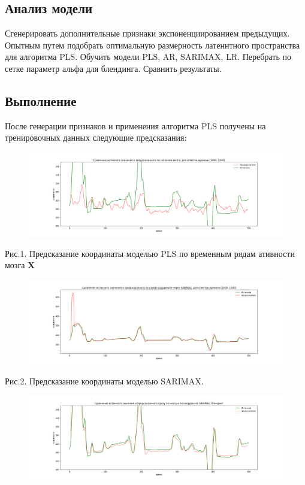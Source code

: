 \documentclass{article}
\begin{document}
\subsection{Анализ модели}
Сгенерировать дополнительные признаки экспоненциированием предыдущих. Опытным путем подобрать оптимальную размерность латеннтного пространства для алгоритма PLS. Обучить модели PLS, AR, SARIMAX, LR. Перебрать по сетке параметр альфа для блендинга. Сравнить результаты.
\subsection{Выполнение}
После генерации признаков и применения алгоритма PLS получены на тренировочных данных следующие предсказания:

\begin{figure}[H]
\includegraphics[scale=0.34]{images/1.png}
\end{figure}
Рис.1. Предсказание координаты моделью PLS по временным рядам ативности мозга $\mathbf{X}$
\begin{figure}[H]
\includegraphics[scale=0.34]{images/2.png}
\end{figure}
Рис.2. Предсказание координаты моделью SARIMAX.
\begin{figure}[H]
\includegraphics[scale=0.34]{images/3.png}
\end{figure}
\end{document}
